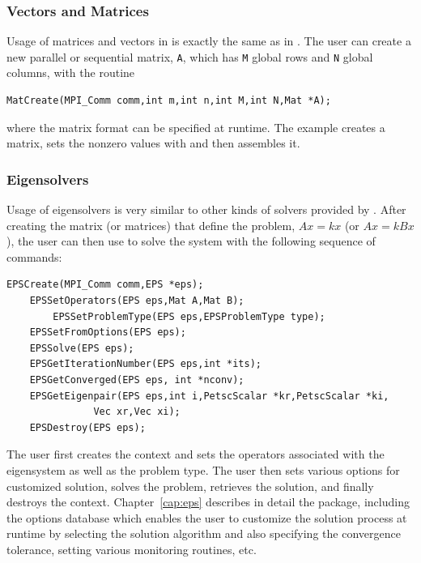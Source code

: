 \subsubsection*{Vectors and Matrices}

Usage of matrices and vectors in \slepc is exactly the same as in \petsc.
The user can create a new parallel or sequential matrix, \texttt{A}, which
has \texttt{M} global rows and \texttt{N} global columns, with the routine
	\begin{Verbatim}[fontsize=\small]
	MatCreate(MPI_Comm comm,int m,int n,int M,int N,Mat *A);
	\end{Verbatim}
where the matrix format can be specified at runtime. The example creates a matrix, sets the nonzero values with  and then assembles it.

\subsubsection*{Eigensolvers}

Usage of eigensolvers is very similar to other kinds of solvers provided by \petsc.
After creating the matrix (or matrices) that define the problem,
$Ax = kx$ (or $Ax=kBx$), the user can then use  to solve the system 
with the following sequence of commands: 
 
  
	\begin{Verbatim}[fontsize=\small,numbers=none]
	EPSCreate(MPI_Comm comm,EPS *eps);
	EPSSetOperators(EPS eps,Mat A,Mat B);
        EPSSetProblemType(EPS eps,EPSProblemType type);
	EPSSetFromOptions(EPS eps);
	EPSSolve(EPS eps);
	EPSGetIterationNumber(EPS eps,int *its);
	EPSGetConverged(EPS eps, int *nconv);
	EPSGetEigenpair(EPS eps,int i,PetscScalar *kr,PetscScalar *ki,
               Vec xr,Vec xi);
	EPSDestroy(EPS eps);
	\end{Verbatim}
The user first creates the  context and sets the operators
associated with the eigensystem as well as the problem type. The user then sets various options for
customized solution, solves the problem, retrieves the solution, 
and finally destroys the  context.
Chapter~\ref{cap:eps} describes in detail the  package, including
the options database which enables the user to customize the solution
process at runtime by selecting the solution algorithm and also specifying the convergence tolerance, setting various monitoring routines, etc.

